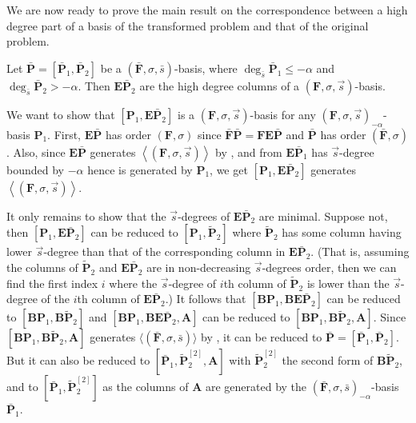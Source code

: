 We are now ready to prove the main result on the correspondence between
a high degree part of a basis of the transformed problem and that
of the original problem. 
\begin{thm}
\label{thm:correctHighDegreeElements}Let $\bar{\mathbf{P}}=[\bar{\mathbf{P}}_{1},\bar{\mathbf{P}}_{2}]$
be a $\left(\bar{\mathbf{F}},\sigma,\bar{s}\right)$-basis, where
$\deg_{\bar{s}}\bar{\mathbf{P}}_{1}\le-\alpha$ and $\deg_{\bar{s}}\bar{\mathbf{P}}_{2}>-\alpha$.
Then $\mathbf{E}\bar{\mathbf{P}}_{2}$ are the high degree columns
of a $\left(\mathbf{F},\sigma,\vec{s}\right)$-basis. \end{thm}
\begin{pf}
We want to show that $[\mathbf{P}_{1},\mathbf{E}\bar{\mathbf{P}}_{2}]$
is a $\left(\mathbf{F},\sigma,\vec{s}\right)$-basis for any $\left(\mathbf{F},\sigma,\vec{s}\right)_{-\alpha}$-basis
$\mathbf{P}_{1}$. First, $\mathbf{E}\bar{\mathbf{P}}$ has order
$(\mathbf{F},\sigma)$ since $\bar{\mathbf{F}}\bar{\mathbf{P}}=\mathbf{F}\mathbf{E}\bar{\mathbf{P}}$
and $\bar{\mathbf{P}}$ has order $\left(\bar{\mathbf{F}},\sigma\right)$.
Also, since $\mathbf{E}\bar{\mathbf{P}}$ generates $\left\langle \left(\mathbf{F},\sigma,\vec{s}\right)\right\rangle $
by , and from 
$\mathbf{E}\bar{\mathbf{P}}_{1}$ has $\vec{s}$-degree bounded by
$-\alpha$ hence is generated by $\mathbf{P}_{1}$, we get $\left[\mathbf{P}_{1},\mathbf{E}\bar{\mathbf{P}}_{2}\right]$
generates $\left\langle \left(\mathbf{F},\sigma,\vec{s}\right)\right\rangle $.

It only remains to show that the $\vec{s}$-degrees of $\mathbf{E}\bar{\mathbf{P}}_{2}$
are minimal. Suppose not, then $[\mathbf{P}_{1},\mathbf{E}\bar{\mathbf{P}}_{2}]$
can be reduced to $[\mathbf{P}_{1},\tilde{\mathbf{P}}_{2}]$ where
$\tilde{\mathbf{P}}_{2}$ has some column having lower $\vec{s}$-degree
than that of the corresponding column in $\mathbf{E}\bar{\mathbf{P}}_{2}$.
(That is, assuming the columns of $\tilde{\mathbf{P}}_{2}$ and $\mathbf{E}\bar{\mathbf{P}}_{2}$
are in non-decreasing $\vec{s}$-degrees order, then we can find the
first index $i$ where the $\vec{s}$-degree of $i$th column of $\tilde{\mathbf{P}}_{2}$
is lower than the $\vec{s}$-degree of the $i$th column of $\mathbf{E}\bar{\mathbf{P}}_{2}$.)
It follows that $[\mathbf{B}\mathbf{P}_{1},\mathbf{B}\mathbf{E}\bar{\mathbf{P}}_{2}]$
can be reduced to $[\mathbf{B}\mathbf{P}_{1},\mathbf{B}\tilde{\mathbf{P}}_{2}]$
and $[\mathbf{B}\mathbf{P}_{1},\mathbf{B}\mathbf{E}\bar{\mathbf{P}}_{2},\mathbf{A}]$
can be reduced to $[\mathbf{B}\mathbf{P}_{1},\mathbf{B}\tilde{\mathbf{P}}_{2},\mathbf{A}]$.
Since $[\mathbf{B}\mathbf{P}_{1},\mathbf{B}\tilde{\mathbf{P}}_{2},\mathbf{A}]$
generates $\langle(\bar{\mathbf{F}},\sigma,\bar{s})\rangle$ by ,
it can be reduced to $\bar{\mathbf{P}}=[\bar{\mathbf{P}}_{1},\bar{\mathbf{P}}_{2}]$.
But it can also be reduced to $[\bar{\mathbf{P}}_{1},\tilde{\mathbf{P}}_{2}^{[2]},\mathbf{A}]$
with $\tilde{\mathbf{P}}_{2}^{[2]}$ the second form of $\mathbf{B}\tilde{\mathbf{P}}_{2}$,
and to $[\bar{\mathbf{P}}_{1},\tilde{\mathbf{P}}_{2}^{[2]}]$ as the
columns of $\mathbf{A}$ are generated by the $\left(\bar{\mathbf{F}},\sigma,\bar{s}\right)_{-\alpha}$-basis
$\bar{\mathbf{P}}_{1}$.


\end{pf}
